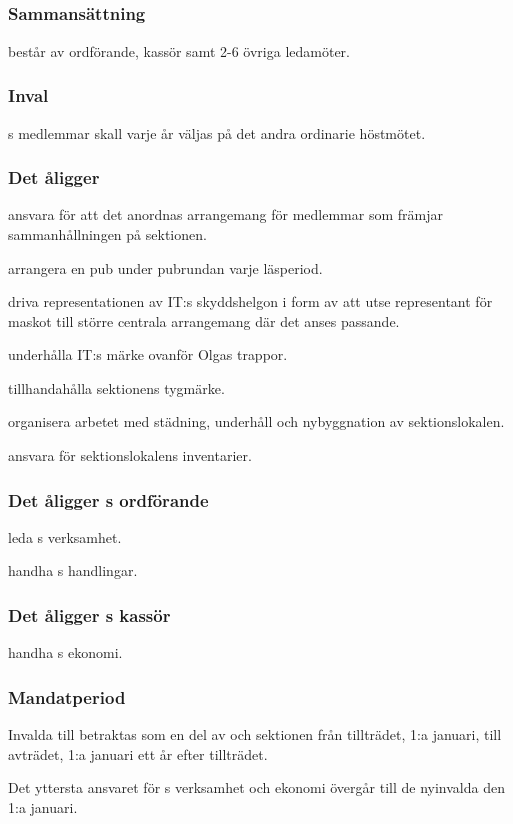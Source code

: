 \subsection{\PRITFULL}
\subsubsection{Sammansättning}
\PRIT{} består av ordförande, kassör samt 2-6 övriga ledamöter.

\subsubsection{Inval}
\PRIT{}s medlemmar skall varje år väljas på det andra ordinarie höstmötet.

\subsubsection{Det åligger \PRIT}
\begin{att}
	\item ansvara för att det anordnas arrangemang för medlemmar som främjar sammanhållningen på sektionen.
	\item arrangera en pub under pubrundan varje läsperiod.
	\item driva representationen av IT:s skyddshelgon i form av att utse representant för maskot till större centrala arrangemang där det anses passande.
	\item underhålla IT:s märke ovanför Olgas trappor.
	\item tillhandahålla sektionens tygmärke.
	\item organisera arbetet med städning, underhåll och nybyggnation av sektionslokalen.
	\item ansvara för sektionslokalens inventarier.
\end{att}

\subsubsection{Det åligger \PRIT{}s ordförande}
\begin{att}
	\item leda \PRIT{}s verksamhet.
	\item handha \PRIT{}s handlingar.
\end{att}

\subsubsection{Det åligger \PRIT{}s kassör}
\begin{att}
	\item handha \PRIT{}s ekonomi.
\end{att}

\subsubsection{Mandatperiod}
Invalda till \PRIT{} betraktas som en del av \PRIT{} och sektionen från tillträdet, 1:a januari, till avträdet, 1:a januari ett år efter tillträdet.

Det yttersta ansvaret för \PRIT{}s verksamhet och ekonomi övergår till de nyinvalda den 1:a januari.